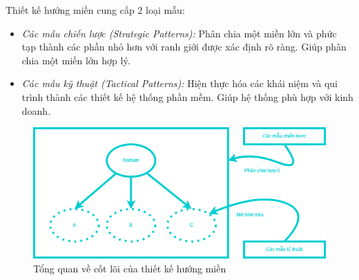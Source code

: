 Thiết kế hướng miền cung cấp 2 loại mẫu:

\begin{itemize}

\item \emph{Các mẫu chiến lược (Strategic Patterns):} Phân chia một miền lớn và phức tạp thành các phần nhỏ hơn với ranh giới được xác định rõ ràng. Giúp phân chia một miền lớn hợp lý.

\item \emph{Các mẫu kỹ thuật (Tactical Patterns):} Hiện thực hóa các khái niệm và qui trình thành các thiết kế hệ thống phần mềm. Giúp hệ thống phù hợp với kinh doanh.

\end{itemize}

\begin{figure}[H]

\centering

\includegraphics[scale = 0.5]{pictures/_tong_quan_ve_cot_loi_cua_thiet_ke_huong_mien/main.drawio.png}

\caption{Tổng quan về cốt lõi của thiết kế hướng miền}

\end{figure}

